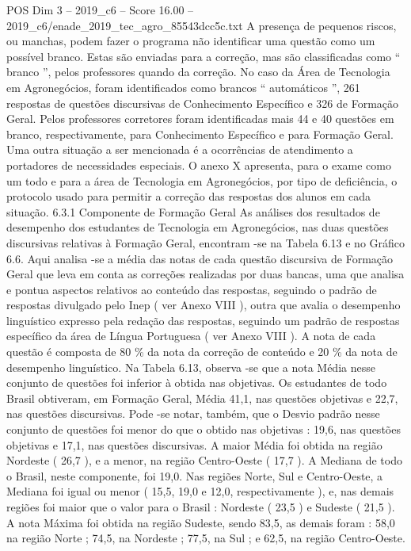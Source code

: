 \begin{textsample}{POS Dim 3 – 2019\_c6 – Score 16.00 – 2019\_c6/enade\_2019\_tec\_agro\_85543dcc5c.txt}
A presença de pequenos riscos, ou manchas, podem fazer o programa não identificar uma questão como um possível branco.
Estas são enviadas para a correção, mas são classificadas como “ branco ”, pelos professores quando da correção.
No caso da Área de Tecnologia em Agronegócios, foram identificados como brancos “ automáticos ”, 261 respostas de questões discursivas de Conhecimento Específico e 326 de Formação Geral.
Pelos professores corretores foram identificadas mais 44 e 40 questões em branco, respectivamente, para Conhecimento Específico e para Formação Geral.
Uma outra situação a ser mencionada é a ocorrências de atendimento a portadores de necessidades especiais.
O anexo X apresenta, para o exame como um todo e para a área de Tecnologia em Agronegócios, por tipo de deficiência, o protocolo usado para permitir a correção das respostas dos alunos em cada situação. 6.3.1 Componente de Formação Geral As análises dos resultados de desempenho dos estudantes de Tecnologia em Agronegócios, nas duas questões discursivas relativas à Formação Geral, encontram -se na Tabela 6.13 e no Gráfico 6.6.
Aqui analisa -se a média das notas de cada questão discursiva de Formação Geral que leva em conta as correções realizadas por duas bancas, uma que analisa e pontua aspectos relativos ao conteúdo das respostas, seguindo o padrão de respostas divulgado pelo Inep ( ver Anexo VIII ), outra que avalia o desempenho linguístico expresso pela redação das respostas, seguindo um padrão de respostas específico da área de Língua Portuguesa ( ver Anexo VIII ).
A nota de cada questão é composta de 80 \% da nota da correção de conteúdo e 20 \% da nota de desempenho linguístico.
Na Tabela 6.13, observa -se que a nota Média nesse conjunto de questões foi inferior à obtida nas objetivas.
Os estudantes de todo Brasil obtiveram, em Formação Geral, Média 41,1, nas questões objetivas e 22,7, nas questões discursivas.
Pode -se notar, também, que o Desvio padrão nesse conjunto de questões foi menor do que o obtido nas objetivas : 19,6, nas questões objetivas e 17,1, nas questões discursivas.
A maior Média foi obtida na região Nordeste ( 26,7 ), e a menor, na região Centro-Oeste ( 17,7 ).
A Mediana de todo o Brasil, neste componente, foi 19,0.
Nas regiões Norte, Sul e Centro-Oeste, a Mediana foi igual ou menor ( 15,5, 19,0 e 12,0, respectivamente ), e, nas demais regiões foi maior que o valor para o Brasil : Nordeste ( 23,5 ) e Sudeste ( 21,5 ).
A nota Máxima foi obtida na região Sudeste, sendo 83,5, as demais foram : 58,0 na região Norte ; 74,5, na Nordeste ; 77,5, na Sul ; e 62,5, na região Centro-Oeste.

\end{textsample}
